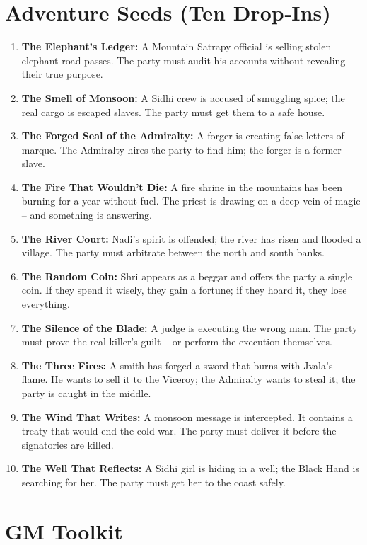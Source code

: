 \documentclass[11pt]{book}
\begin{document}
\section{Adventure Seeds (Ten Drop‑Ins)}
\begin{enumerate}
    \item \textbf{The Elephant's Ledger:} A Mountain Satrapy official is selling stolen elephant‑road passes. The party must audit his accounts without revealing their true purpose.
    \item \textbf{The Smell of Monsoon:} A Sidhi crew is accused of smuggling spice; the real cargo is escaped slaves. The party must get them to a safe house.
    \item \textbf{The Forged Seal of the Admiralty:} A forger is creating false letters of marque. The Admiralty hires the party to find him; the forger is a former slave.
    \item \textbf{The Fire That Wouldn't Die:} A fire shrine in the mountains has been burning for a year without fuel. The priest is drawing on a deep vein of magic -- and something is answering.
    \item \textbf{The River Court:} Nadi's spirit is offended; the river has risen and flooded a village. The party must arbitrate between the north and south banks.
    \item \textbf{The Random Coin:} Shri appears as a beggar and offers the party a single coin. If they spend it wisely, they gain a fortune; if they hoard it, they lose everything.
    \item \textbf{The Silence of the Blade:} A judge is executing the wrong man. The party must prove the real killer's guilt -- or perform the execution themselves.
    \item \textbf{The Three Fires:} A smith has forged a sword that burns with Jvala's flame. He wants to sell it to the Viceroy; the Admiralty wants to steal it; the party is caught in the middle.
    \item \textbf{The Wind That Writes:} A monsoon message is intercepted. It contains a treaty that would end the cold war. The party must deliver it before the signatories are killed.
    \item \textbf{The Well That Reflects:} A Sidhi girl is hiding in a well; the Black Hand is searching for her. The party must get her to the coast safely.
\end{enumerate}

\section{GM Toolkit}
\end{document}
